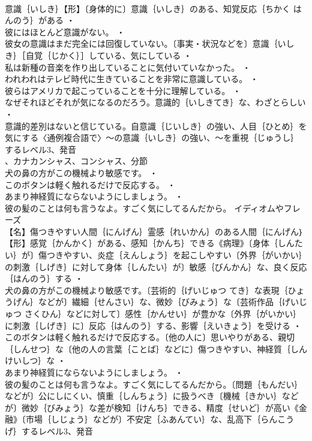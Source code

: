 \documentclass[8pt]{extreport}
\begin{document}
\begin{CJK}{UTF8}{min}
\\	意識｛いしき｝【形】〔身体的に〕意識｛いしき｝のある、知覚反応｛ちかく はんのう｝がある ・
\\	彼にはほとんど意識がない。 ・
\\	彼女の意識はまだ完全には回復していない。〔事実・状況などを〕意識｛いしき｝［自覚｛じかく｝］している、気にしている ・
\\	私は新種の音楽を作り出していることに気付いていなかった。 ・
\\	われわれはテレビ時代に生きていることを非常に意識している。 ・
\\	彼らはアメリカで起こっていることを十分に理解している。 ・
\\	なぜそれほどそれが気になるのだろう。意識的｛いしきてき｝な、わざとらしい ・
\\	意識的差別はないと信じている。自意識｛じいしき｝の強い、人目｛ひとめ｝を気にする〈通例複合語で〉～の意識｛いしき｝の強い、～を重視｛じゅうし｝するレベル3、発音
\\	、カナカンシャス、コンシャス、分節
\\	犬の鼻の方がこの機械より敏感です。 ・
\\	このボタンは軽く触れるだけで反応する。 ・
\\	あまり神経質にならないようにしましょう。 ・
\\	彼の髪のことは何も言うなよ。すごく気にしてるんだから。	イディオムやフレーズ 
\\	【名】傷つきやすい人間｛にんげん｝霊感｛れいかん｝のある人間｛にんげん｝【形】感覚｛かんかく｝がある、感知｛かんち｝できる《病理》〔身体｛しんたい｝が〕傷つきやすい、炎症｛えんしょう｝を起こしやすい〔外界｛がいかい｝の刺激｛しげき｝に対して身体｛しんたい｝が〕敏感｛びんかん｝な、良く反応｛はんのう｝する ・
\\	犬の鼻の方がこの機械より敏感です。〔芸術的｛げいじゅつ てき｝な表現｛ひょうげん｝などが〕繊細｛せんさい｝な、微妙｛びみょう｝な〔芸術作品｛げいじゅつ さくひん｝などに対して〕感性｛かんせい｝が豊かな〔外界｛がいかい｝に刺激｛しげき｝に〕反応｛はんのう｝する、影響｛えいきょう｝を受ける ・
\\	このボタンは軽く触れるだけで反応する。〔他の人に〕思いやりがある、親切｛しんせつ｝な〔他の人の言葉｛ことば｝などに〕傷つきやすい、神経質｛しんけいしつ｝な ・
\\	あまり神経質にならないようにしましょう。 ・
\\	彼の髪のことは何も言うなよ。すごく気にしてるんだから。〔問題｛もんだい｝などが〕公にしにくい、慎重｛しんちょう｝に扱うべき〔機械｛きかい｝などが〕微妙｛びみょう｝な差が検知｛けんち｝できる、精度｛せいど｝が高い《金融》〔市場｛しじょう｝などが〕不安定｛ふあんてい｝な、乱高下｛らんこうげ｝するレベル3、発音

\end{CJK}
\end{document}
